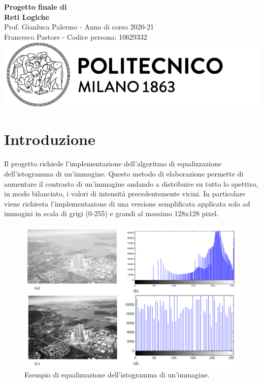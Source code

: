 \documentclass{article}
\begin{document}
\begin{titlepage}
    \centering
    \vspace*{\fill}
    \Huge\textbf{Progetto finale di \\ Reti Logiche}\\
    \vspace{5mm} %
    \Large Prof. Gianluca Palermo - Anno di corso 2020-21\\
    \vspace{5mm} %
    \large Francesco Pastore - Codice persona: 10629332\\
    \vspace{100mm}
    \includegraphics[scale=0.7]{logo.png}
    \vspace*{\fill}
\end{titlepage}

\thispagestyle{empty}
\tableofcontents
\pagebreak
\section{Introduzione}
Il progetto richiede l'implementazione dell'algoritmo di equalizzazione dell'istogramma di un'immagine. Questo metodo di elaborazione permette di aumentare il contrasto di un'immagine andando a distribuire su tutto lo spetttro, in modo bilanciato, i valori di intensità precedentemente vicini. In particolare viene richiesta l'implementazione di una versione semplificata applicata solo ad immagini in scala di grigi (0-255) e grandi al massimo 128x128 pixel.

\begin{figure}[h]
    \includegraphics[scale=0.25]{equalization.png}
    \centering
    \caption{Esempio di equalizzazione dell'istogramma di un'immagine. \cite{equalization}}
\end{figure}
\end{document}
